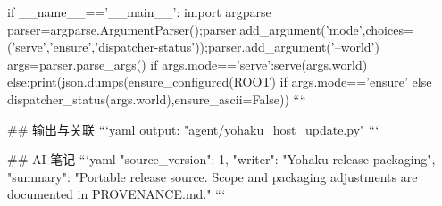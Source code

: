 if __name__=='__main__':
 import argparse
 parser=argparse.ArgumentParser();parser.add_argument('mode',choices=('serve','ensure','dispatcher-status'));parser.add_argument('--world')
 args=parser.parse_args()
 if args.mode=='serve':serve(args.world)
 else:print(json.dumps(ensure_configured(ROOT) if args.mode=='ensure' else dispatcher_status(args.world),ensure_ascii=False))
````

## 输出与关联
```yaml
output: "agent/yohaku_host_update.py"
```

## AI 笔记
```yaml
{"source_version": 1, "writer": "Yohaku release packaging", "summary": "Portable release source. Scope and packaging adjustments are documented in PROVENANCE.md."}
```
